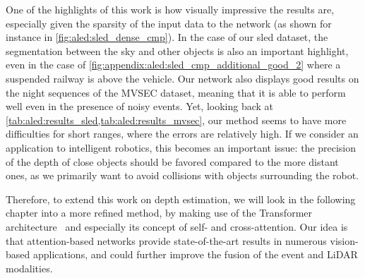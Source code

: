 One of the highlights of this work is how visually impressive the results are, especially given the sparsity of the input data to the network (as shown for instance in \cref{fig:aled:sled_dense_cmp}). In the case of our \acrshort{sled} dataset, the segmentation between the sky and other objects is also an important highlight, even in the case of \cref{fig:appendix:aled:sled_cmp_additional_good_2} where a suspended railway is above the vehicle. Our network also displays good results on the night sequences of the MVSEC dataset, meaning that it is able to perform well even in the presence of noisy events. Yet, looking back at \cref{tab:aled:results_sled,tab:aled:results_mvsec}, our method seems to have more difficulties for short ranges, where the errors are relatively high. If we consider an application to intelligent robotics, this becomes an important issue: the precision of the depth of close objects should be favored compared to the more distant ones, as we primarily want to avoid collisions with objects surrounding the robot.

Therefore, to extend this work on depth estimation, we will look in the following chapter into a more refined method, by making use of the Transformer architecture~\cite{Vaswani2017AttentionIA} and especially its concept of self- and cross-attention. Our idea is that attention-based networks provide state-of-the-art results in numerous vision-based applications, and could further improve the fusion of the event and LiDAR modalities.
